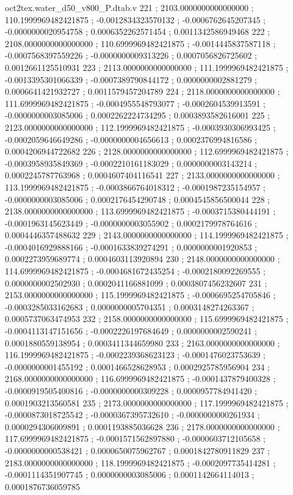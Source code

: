 \begin{filecontents}[overwrite]{oct2tex.water_d50_v800_P.dtab.v}
221 ; 2103.0000000000000000 ; 110.1999969482421875 ; -0.0012834323570132 ; -0.0006762645207345 ; -0.0000000020954758 ; 0.0006352262571454 ; 0.0011342586949468
222 ; 2108.0000000000000000 ; 110.6999969482421875 ; -0.0014445837587118 ; -0.0007568397559226 ; -0.0000000009313226 ; 0.0007056826725602 ; 0.0012661125510931
223 ; 2113.0000000000000000 ; 111.1999969482421875 ; -0.0013395301066339 ; -0.0007389790844172 ; 0.0000000002881279 ; 0.0006641421932727 ; 0.0011579457204789
224 ; 2118.0000000000000000 ; 111.6999969482421875 ; -0.0004955548793077 ; -0.0002604539913591 ; -0.0000000003085006 ; 0.0002262224734295 ; 0.0003893582616001
225 ; 2123.0000000000000000 ; 112.1999969482421875 ; -0.0003930306993425 ; -0.0002059646649286 ; -0.0000000004656613 ; 0.0002376994816586 ; 0.0004206944722682
226 ; 2128.0000000000000000 ; 112.6999969482421875 ; -0.0003958935849369 ; -0.0002210161183029 ; 0.0000000003143214 ; 0.0002245787763968 ; 0.0004607404116541
227 ; 2133.0000000000000000 ; 113.1999969482421875 ; -0.0003866764018312 ; -0.0001987235154957 ; -0.0000000003085006 ; 0.0002176454290748 ; 0.0004545856500044
228 ; 2138.0000000000000000 ; 113.6999969482421875 ; -0.0003715380444191 ; -0.0001963145623449 ; -0.0000000003055902 ; 0.0002179978764616 ; 0.0004446357488632
229 ; 2143.0000000000000000 ; 114.1999969482421875 ; -0.0004016929888166 ; -0.0001633839274291 ; 0.0000000001920853 ; 0.0002273959689774 ; 0.0004603113920894
230 ; 2148.0000000000000000 ; 114.6999969482421875 ; -0.0004681672435254 ; -0.0002180092269555 ; 0.0000000002502930 ; 0.0002041166881099 ; 0.0003807456232607
231 ; 2153.0000000000000000 ; 115.1999969482421875 ; -0.0006695254705846 ; -0.0003285033162683 ; 0.0000000005704351 ; 0.0003148274263367 ; 0.0005737063474953
232 ; 2158.0000000000000000 ; 115.6999969482421875 ; -0.0004113147151656 ; -0.0002226197684649 ; 0.0000000002590241 ; 0.0001880559138954 ; 0.0003411344659980
233 ; 2163.0000000000000000 ; 116.1999969482421875 ; -0.0002239368623123 ; -0.0001476023753639 ; -0.0000000001455192 ; 0.0001466528628953 ; 0.0002925785956904
234 ; 2168.0000000000000000 ; 116.6999969482421875 ; -0.0001437879400328 ; -0.0000919505400816 ; -0.0000000000309228 ; 0.0000957784941420 ; 0.0001903213560581
235 ; 2173.0000000000000000 ; 117.1999969482421875 ; -0.0000873018725542 ; -0.0000367395732610 ; -0.0000000000261934 ; 0.0000294306009891 ; 0.0001193885036628
236 ; 2178.0000000000000000 ; 117.6999969482421875 ; -0.0001571562897880 ; -0.0000603712105658 ; -0.0000000000538421 ; 0.0000650075962767 ; 0.0001842780911829
237 ; 2183.0000000000000000 ; 118.1999969482421875 ; -0.0002097735414281 ; -0.0001114351907745 ; 0.0000000003085006 ; 0.0001142664114013 ; 0.0001876736059785

\end{filecontents}
